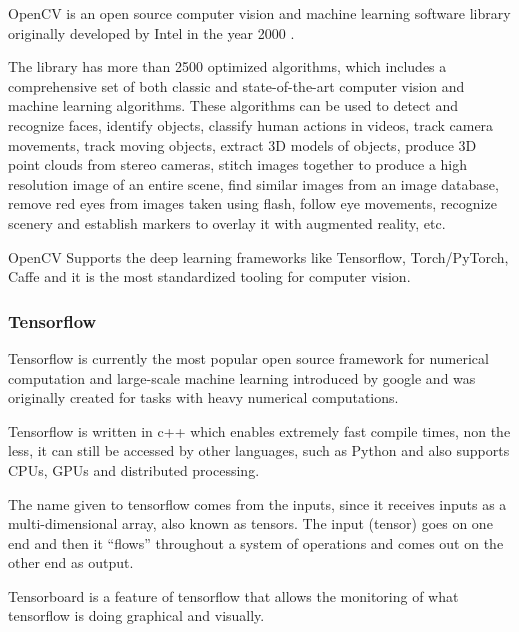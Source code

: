     OpenCV is an open source computer vision and machine learning software library originally developed by Intel in the year 2000 \cite{Culjak2012}.\par

    The library has more than 2500 optimized algorithms, which includes a comprehensive set of both classic and state-of-the-art computer vision and machine learning algorithms. These algorithms can be used to detect and recognize faces, identify objects, classify human actions in videos, track camera movements, track moving objects, extract 3D models of objects, produce 3D point clouds from stereo cameras, stitch images together to produce a high resolution image of an entire scene, find similar images from an image database, remove red eyes from images taken using flash, follow eye movements, recognize scenery and establish markers to overlay it with augmented reality, etc. \cite{opencvweb} \par
    
    OpenCV Supports the deep learning frameworks like Tensorflow, Torch/PyTorch, Caffe and it is the most standardized tooling for computer vision.  

    \subsubsection{Tensorflow}

    \label{Tensorflow}
   

    Tensorflow is currently the most popular open source framework for numerical computation and large-scale machine learning introduced by google and was originally created for tasks with heavy numerical computations.  \cite{Abadi} \cite{Dignam1983} 
    
    Tensorflow is written in c++ which enables extremely fast compile times, non the less, it can still be accessed by other languages, such as Python and also supports CPUs, GPUs and distributed processing. \par
    

    The name given to tensorflow comes from the inputs, since it receives inputs as a multi-dimensional array, also known as tensors. The input (tensor) goes on one end and then it “flows” throughout a system of operations and comes out on the other end as output. \par 
    
    Tensorboard is a feature of tensorflow that allows the monitoring of what tensorflow is doing graphical and visually.\par

